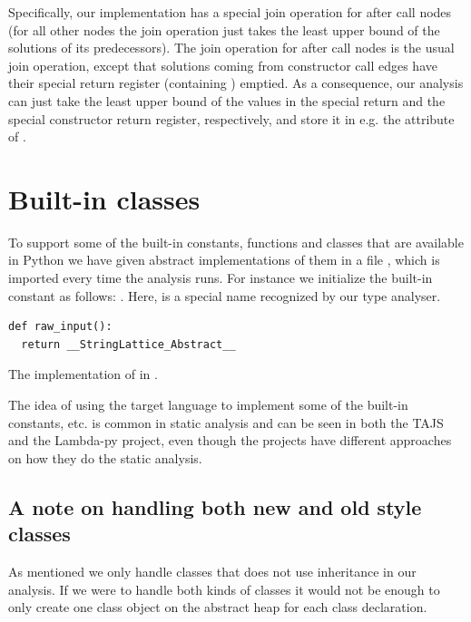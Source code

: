 Specifically, our implementation has a special join operation for after call nodes (for all other nodes the join operation just takes the least upper bound of the solutions of its predecessors). The join operation for after call nodes is the usual join operation, except that solutions coming from constructor call edges have their special return register (containing ) emptied. As a consequence, our analysis can just take the least upper bound of the values in the special return and the special constructor return register, respectively, and store it in e.g. the attribute  of .


\section{Built-in classes}
To support some of the built-in constants, functions and classes that are available in Python we have given abstract implementations of them in a file , which is imported every time the analysis runs. For instance we initialize the built-in constant  as follows: . Here,  is a special name recognized by our type analyser.

\begin{listing}[H]
	\begin{verbatim}
def raw_input():
  return __StringLattice_Abstract__
	\end{verbatim}
	\caption{The implementation of  in .}\label{code:InitConstructorClass}
\end{listing}

The idea of using the target language to implement some of the built-in constants, etc. is common in static analysis and can be seen in both the TAJS\cite{tajs} and the Lambda-py\cite{lambdapy} project, even though the projects have different approaches on how they do the static analysis.


\subsection{A note on handling both new and old style classes}
As mentioned we only handle classes that does not use inheritance in our analysis. If we were to handle both kinds of classes it would not be enough to only create one class object on the abstract heap for each class declaration.

